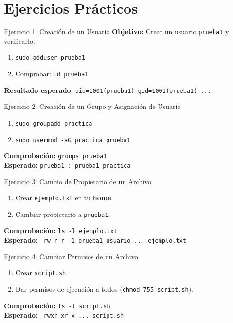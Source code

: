 \documentclass{beamer}
\begin{document}
\section{Ejercicios Prácticos}

\begin{frame}{Ejercicio 1: Creación de un Usuario}
    \textbf{Objetivo:} Crear un usuario \texttt{prueba1} y verificarlo.
    \begin{enumerate}
        \item \texttt{sudo adduser prueba1}
        \item Comprobar: \texttt{id prueba1}
    \end{enumerate}
    \textbf{Resultado esperado:} \texttt{uid=1001(prueba1) gid=1001(prueba1) ...}
\end{frame}

\begin{frame}{Ejercicio 2: Creación de un Grupo y Asignación de Usuario}
    \begin{enumerate}
        \item \texttt{sudo groupadd practica}
        \item \texttt{sudo usermod -aG practica prueba1}
    \end{enumerate}
    \textbf{Comprobación:} \texttt{groups prueba1} \\
    \textbf{Esperado:} \texttt{prueba1 : prueba1 practica}
\end{frame}

\begin{frame}{Ejercicio 3: Cambio de Propietario de un Archivo}
    \begin{enumerate}
        \item Crear \texttt{ejemplo.txt} en tu \textbf{home}.
        \item Cambiar propietario a \texttt{prueba1}.
    \end{enumerate}
    \textbf{Comprobación:} \texttt{ls -l ejemplo.txt} \\
    \textbf{Esperado:} \texttt{-rw-r--r-- 1 prueba1 usuario ... ejemplo.txt}
\end{frame}

\begin{frame}{Ejercicio 4: Cambiar Permisos de un Archivo}
    \begin{enumerate}
        \item Crear \texttt{script.sh}.
        \item Dar permisos de ejecución a todos (\texttt{chmod 755 script.sh}).
    \end{enumerate}
    \textbf{Comprobación:} \texttt{ls -l script.sh} \\
    \textbf{Esperado:} \texttt{-rwxr-xr-x ... script.sh}
\end{frame}
\end{document}
